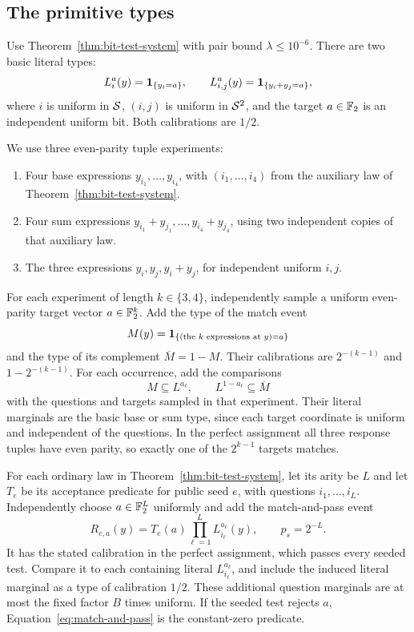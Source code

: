 \subsection{The primitive types}

Use Theorem~\ref{thm:bit-test-system} with pair bound
$\lambda\leq10^{-6}$. There are two basic literal types:
\[
 L_i^a(y)=\mathbf 1_{\{y_i=a\}},
 \qquad
 L_{i,j}^a(y)=\mathbf 1_{\{y_i+y_j=a\}},
\]
where $i$ is uniform in $\mathcal S$, $(i,j)$ is uniform in $\mathcal S^2$,
and the target $a\in\mathbb F_2$ is an independent uniform bit.
Both calibrations are $1/2$.

We use three even-parity tuple experiments:
\begin{enumerate}
\item Four base expressions $y_{i_1},\ldots,y_{i_4}$, with
$(i_1,\ldots,i_4)$ from the auxiliary law of
Theorem~\ref{thm:bit-test-system}.
\item Four sum expressions
$y_{i_1}+y_{j_1},\ldots,y_{i_4}+y_{j_4}$, using two independent
copies of that auxiliary law.
\item The three expressions $y_i,y_j,y_i+y_j$, for independent
uniform $i,j$.
\end{enumerate}
For each experiment of length $k\in\{3,4\}$, independently sample a
uniform even-parity target vector $a\in\mathbb F_2^k$. Add the type of the
match event
\[
 M(y)=\mathbf 1_{\{(\text{the }k\text{ expressions at }y)=a\}}
\]
and the type of its complement $\overline M=1-M$.
Their calibrations are $2^{-(k-1)}$ and $1-2^{-(k-1)}$.
For each occurrence, add the comparisons
\begin{equation}\label{eq:match-complement-comparisons}
 M\subseteq L^{a_\ell},
 \qquad L^{1-a_\ell}\subseteq\overline M
\end{equation}
with the questions and targets sampled in that experiment.
Their literal marginals are the basic base or sum type, since each
target coordinate is uniform and independent of the questions.
In the perfect assignment all three response tuples have even
parity, so exactly one of the $2^{k-1}$ targets matches.

For each ordinary law in Theorem~\ref{thm:bit-test-system}, let its
arity be $L$ and let $T_e$ be its acceptance predicate for public
seed $e$, with questions $i_1,\ldots,i_L$. Independently choose
$a\in\mathbb F_2^L$ uniformly and add the match-and-pass event
\begin{equation}\label{eq:match-and-pass}
 R_{e,a}(y)=T_e(a)\prod_{\ell=1}^L L_{i_\ell}^{a_\ell}(y),
 \qquad p_s=2^{-L}.
\end{equation}
It has the stated calibration in the perfect assignment, which
passes every seeded test. Compare it to each containing literal
$L_{i_\ell}^{a_\ell}$, and include the induced literal marginal as
a type of calibration $1/2$. These additional question marginals
are at most the fixed factor $B$ times uniform.
If the seeded test rejects $a$, Equation~\ref{eq:match-and-pass}
is the constant-zero predicate.

